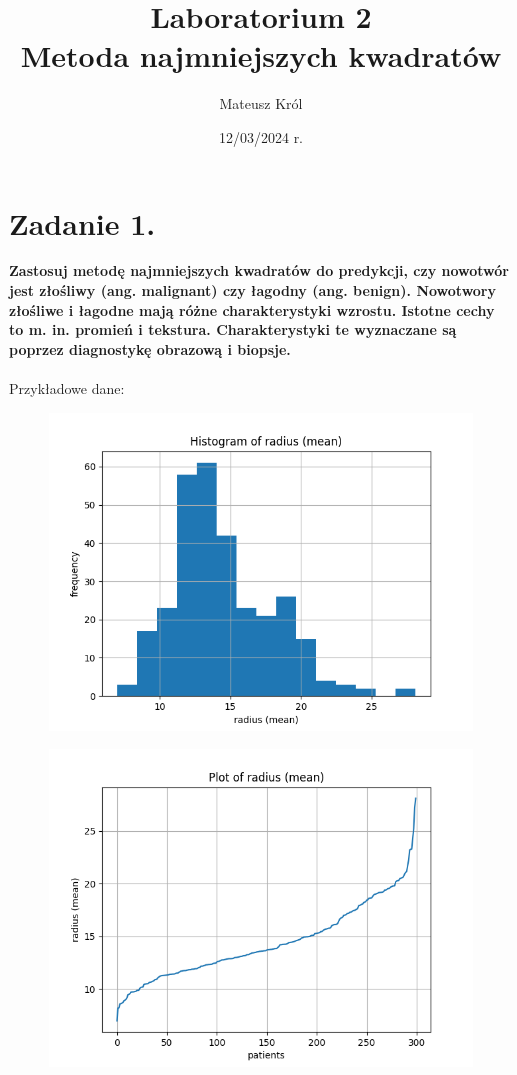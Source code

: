 \documentclass{article}
\title{%
Laboratorium 2\\
  \huge Metoda najmniejszych kwadratów}
\author{Mateusz Król}
\date{12/03/2024 r.}
\begin{document}
\maketitle


\section*{Zadanie 1.}
\textbf{Zastosuj metodę najmniejszych kwadratów do predykcji, czy nowotwór 
jest złośliwy (ang. malignant) czy łagodny (ang. benign).
Nowotwory złośliwe i łagodne mają różne charakterystyki wzrostu. Istotne cechy to m. in. promień i tekstura. Charakterystyki te wyznaczane są poprzez
diagnostykę obrazową i biopsje.} 
\\\\
Przykładowe dane:
\begin{figure}[ht!]
  \includegraphics[width=\linewidth]{figures/hist.png}
\end{figure}
\begin{figure}[ht!]
  \includegraphics[width=\linewidth]{figures/plot.png}
\end{figure}
\end{document}
